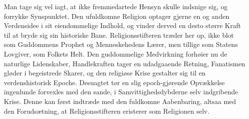 \documentclass[12pt,a4paper]{book}
\begin{document}
Man tage sig vel iagt, at ikke fremmedartede Hensyn skulle indsnige sig, og forrykke
Synspunktet. Den ufuldkomne Religion optager gjerne en og anden Verdensidee i sit
eiendommelige Indhold, og vinder derved en desto større Kraft til at bryde sig sin
historiske Bane. Religionsstifteren træder her op, ikke blot som Guddommens Prophet og
Menneskehedens Lærer, men tillige som Statens Lovgiver, som Folkets Helt. Den
guddommelige Medvirkning forhøier nu de naturlige Lidenskaber, Handlekraften tager en
udadgaaende Retning, Fanatismen gløder i begeistrede Skarer, og den religiøse Krise
gestalter sig til en verdenshistorisk Epoche. Desuagtet tør en slig epoch-gjørende
Opvækkelse ingenlunde forvexles med den sande, i Samvittighedsdybderne selv indgribende
Krise. Denne kan først indtræde med den fuldkomne Aabenbaring, altsaa med den
Forudsætning, at Religionsstifteren eristerer som Religionen selv.
\end{document}
